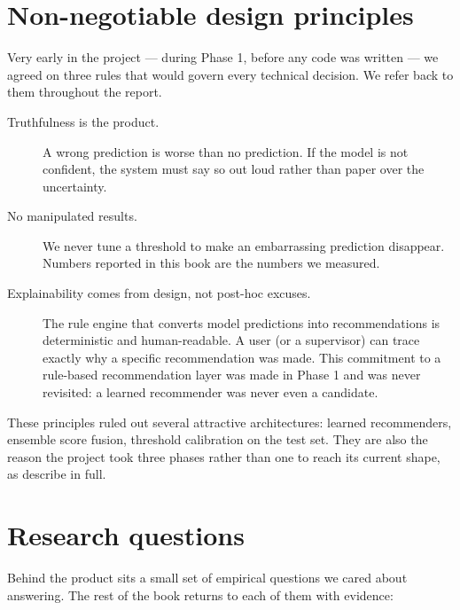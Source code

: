 \documentclass[11pt,a4paper,oneside]{report}
\begin{document}
\section{Non-negotiable design principles}\label{sec:principles}

Very early in the project --- during Phase 1, before any code was
written --- we agreed on three rules that would govern every technical
decision. We refer back to them throughout the report.

\begin{description}
    \item[Truthfulness is the product.] A wrong prediction is worse
        than no prediction. If the model is not confident, the system
        must say so out loud rather than paper over the uncertainty.
    \item[No manipulated results.] We never tune a threshold to make
        an embarrassing prediction disappear. Numbers reported in this
        book are the numbers we measured.
    \item[Explainability comes from design, not post-hoc excuses.] The
        rule engine that converts model predictions into recommendations
        is deterministic and human-readable. A user (or a supervisor)
        can trace exactly why a specific recommendation was made. This
        commitment to a rule-based recommendation layer was made in
        Phase 1 and was never revisited: a learned recommender was
        never even a candidate.
\end{description}

These principles ruled out several attractive architectures:
learned recommenders, ensemble score fusion, threshold calibration on
the test set. They are also the reason the project took three phases
rather than one to reach its current shape, as 
describe in full.

\section{Research questions}

Behind the product sits a small set of empirical questions we cared
about answering. The rest of the book returns to each of them with
evidence:
\end{document}
